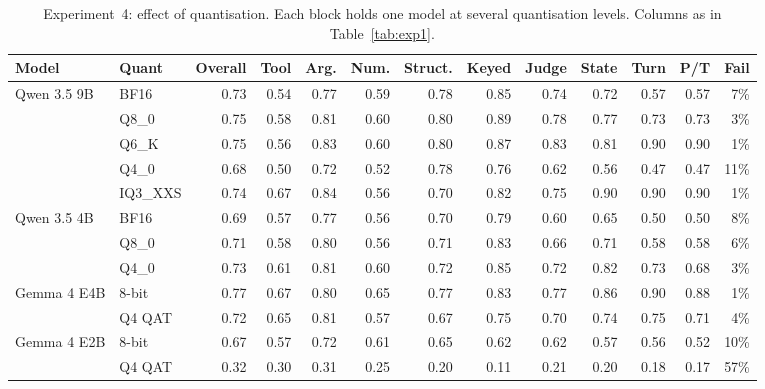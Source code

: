 \begin{table}[!t]
\centering
\caption{Experiment~4: effect of quantisation. Each block holds one model at several quantisation levels. Columns as in Table~\ref{tab:exp1}.}
\label{tab:exp3}
\small
\setlength{\tabcolsep}{4pt}
\begin{tabular}{@{}ll rrrrrrrrrrr@{}}
\toprule
Model & Quant & Overall & Tool & Arg. & Num. & Struct. & Keyed & Judge & State & Turn & P/T & Fail \\
\midrule
Qwen 3.5 9B & BF16 & 0.73 & 0.54 & 0.77 & 0.59 & 0.78 & 0.85 & 0.74 & 0.72 & 0.57 & 0.57 & 7\% \\
 & Q8\_0 & 0.75 & 0.58 & 0.81 & 0.60 & 0.80 & 0.89 & 0.78 & 0.77 & 0.73 & 0.73 & 3\% \\
 & Q6\_K & 0.75 & 0.56 & 0.83 & 0.60 & 0.80 & 0.87 & 0.83 & 0.81 & 0.90 & 0.90 & 1\% \\
 & Q4\_0 & 0.68 & 0.50 & 0.72 & 0.52 & 0.78 & 0.76 & 0.62 & 0.56 & 0.47 & 0.47 & 11\% \\
 & IQ3\_XXS & 0.74 & 0.67 & 0.84 & 0.56 & 0.70 & 0.82 & 0.75 & 0.90 & 0.90 & 0.90 & 1\% \\
\midrule
Qwen 3.5 4B & BF16 & 0.69 & 0.57 & 0.77 & 0.56 & 0.70 & 0.79 & 0.60 & 0.65 & 0.50 & 0.50 & 8\% \\
 & Q8\_0 & 0.71 & 0.58 & 0.80 & 0.56 & 0.71 & 0.83 & 0.66 & 0.71 & 0.58 & 0.58 & 6\% \\
 & Q4\_0 & 0.73 & 0.61 & 0.81 & 0.60 & 0.72 & 0.85 & 0.72 & 0.82 & 0.73 & 0.68 & 3\% \\
\midrule
Gemma 4 E4B & 8-bit & 0.77 & 0.67 & 0.80 & 0.65 & 0.77 & 0.83 & 0.77 & 0.86 & 0.90 & 0.88 & 1\% \\
 & Q4 QAT & 0.72 & 0.65 & 0.81 & 0.57 & 0.67 & 0.75 & 0.70 & 0.74 & 0.75 & 0.71 & 4\% \\
\midrule
Gemma 4 E2B & 8-bit & 0.67 & 0.57 & 0.72 & 0.61 & 0.65 & 0.62 & 0.62 & 0.57 & 0.56 & 0.52 & 10\% \\
 & Q4 QAT & 0.32 & 0.30 & 0.31 & 0.25 & 0.20 & 0.11 & 0.21 & 0.20 & 0.18 & 0.17 & 57\% \\
\bottomrule
\end{tabular}
\end{table}
